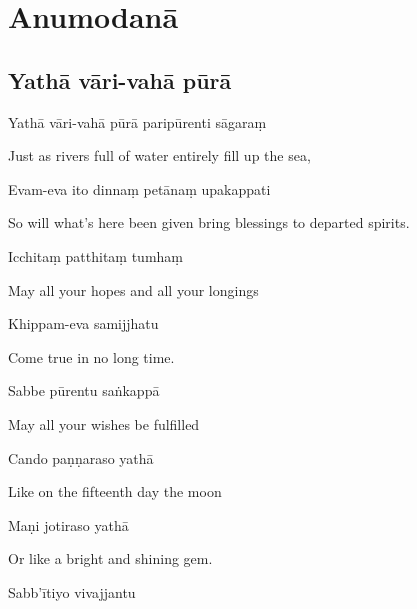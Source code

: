 \chapter{Anumodanā}

\section{Yathā vāri-vahā pūrā}



Yathā vāri-vahā pūrā paripūrenti sāgaraṃ

\begin{english}
  Just as rivers full of water entirely fill up the sea,
\end{english}

Evam-eva ito dinnaṃ petānaṃ upakappati

\begin{english}
  So will what's here been given bring blessings to departed spirits.
\end{english}

Icchitaṃ patthitaṃ tumhaṃ

\begin{english}
  May all your hopes and all your longings
\end{english}

Khippam-eva samijjhatu

\begin{english}
  Come true in no long time.
\end{english}

Sabbe pūrentu saṅkappā

\begin{english}
  May all your wishes be fulfilled
\end{english}

Cando paṇṇaraso yathā

\begin{english}
  Like on the fifteenth day the moon
\end{english}

Maṇi jotiraso yathā

\begin{english}
  Or like a bright and shining gem. 
\end{english}


Sabb'ītiyo vivajjantu


